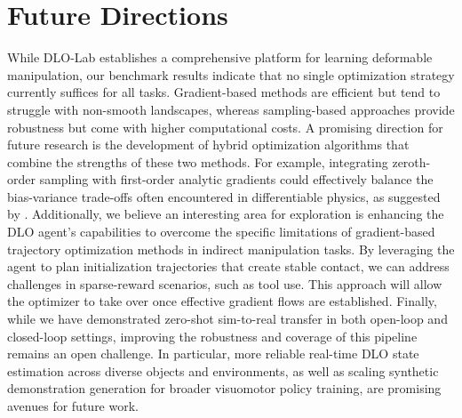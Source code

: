 \section{Future Directions}
While DLO-Lab establishes a comprehensive platform for learning deformable manipulation, our benchmark results indicate that no single optimization strategy currently suffices for all tasks. Gradient-based methods are efficient but tend to struggle with non-smooth landscapes, whereas sampling-based approaches provide robustness but come with higher computational costs. A promising direction for future research is the development of hybrid optimization algorithms that combine the strengths of these two methods. For example, integrating zeroth-order sampling with first-order analytic gradients could effectively balance the bias-variance trade-offs often encountered in differentiable physics, as suggested by \citep{suh2022differentiable}. Additionally, we believe an interesting area for exploration is enhancing the DLO agent's capabilities to overcome the specific limitations of gradient-based trajectory optimization methods in indirect manipulation tasks. By leveraging the agent to plan initialization trajectories that create stable contact, we can address challenges in sparse-reward scenarios, such as tool use. This approach will allow the optimizer to take over once effective gradient flows are established. Finally, while we have demonstrated zero-shot sim-to-real transfer in both open-loop and closed-loop settings, improving the robustness and coverage of this pipeline remains an open challenge. In particular, more reliable real-time DLO state estimation across diverse objects and environments, as well as scaling synthetic demonstration generation for broader visuomotor policy training, are promising avenues for future work.